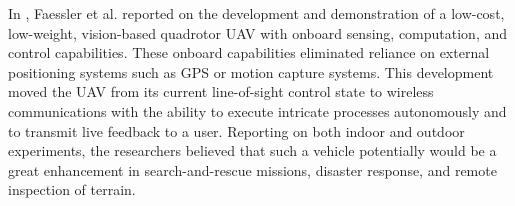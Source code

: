 In \cite{Faessler2016}, Faessler et al. reported on the development and demonstration of a low-cost, low-weight, vision-based quadrotor UAV with onboard sensing, computation, and control capabilities. These onboard capabilities eliminated reliance on external positioning systems such as GPS or motion capture systems. This development moved the UAV from its current line-of-sight control state to wireless communications with the ability to execute intricate processes autonomously and to transmit live feedback to a user. Reporting on both indoor and outdoor experiments, the researchers believed that such a vehicle potentially would be a great enhancement in search-and-rescue missions, disaster response, and remote inspection of terrain. 
